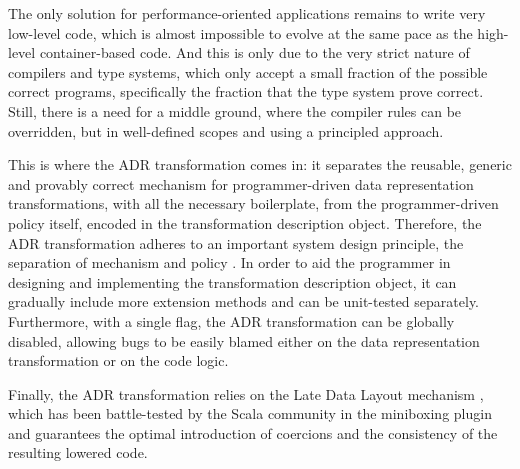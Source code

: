 The only solution for performance-oriented applications remains to write very low-level code, which is almost impossible to evolve at the same pace as the high-level container-based code. And this is only due to the very strict nature of compilers and type systems, which only accept a small fraction of the possible correct programs, specifically the fraction that the type system prove correct. Still, there is a need for a middle ground, where the compiler rules can be overridden, but in well-defined scopes and using a principled approach. %

This is where the ADR transformation comes in: it separates the reusable, generic and provably correct mechanism for programmer-driven data representation transformations, with all the necessary boilerplate, from the programmer-driven policy itself, encoded in the transformation description object. Therefore, the ADR transformation adheres to an important system design principle, the separation of mechanism and policy \cite{lampson-mechanism-policy}. In order to aid the programmer in designing and implementing the transformation description object, it can gradually include more extension methods and can be unit-tested separately. Furthermore, with a single flag, the ADR transformation can be globally disabled, allowing bugs to be easily blamed either on the data representation transformation or on the code logic.

Finally, the ADR transformation relies on the Late Data Layout mechanism \cite{ldl,ldl-www}, which has been battle-tested by the Scala community in the miniboxing plugin \cite{miniboxing,miniboxing-www} and guarantees the optimal introduction of coercions and the consistency of the resulting lowered code.
